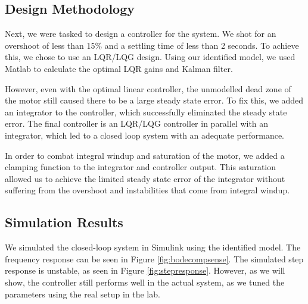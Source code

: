 \documentclass[11pt]{article}
\begin{document}
\subsection{Design Methodology}

Next, we were tasked to design a controller for the system. We shot for an overshoot of less than 15\%
and a settling time of less than 2 seconds. To achieve this, we chose to use an LQR/LQG design. Using our 
identified model, we used Matlab to calculate the optimal LQR gains and Kalman filter. 

However, even with the optimal linear controller, the unmodelled dead zone of the motor still caused
there to be a large steady state error. To fix this, we added an integrator to the controller, which successfully
eliminated the steady state error. The final controller is an LQR/LQG controller in parallel with an integrator, which led
to a closed loop system with an adequate performance.

In order to combat integral windup and saturation of the motor, we added a 
clamping function to the integrator and controller output. This saturation
allowed us to achieve the limited steady state error of the integrator without 
suffering from the overshoot and instabilities that come from integral windup.

\subsection{Simulation Results}
We simulated the closed-loop system in Simulink using the identified model. The frequency response
can be seen in Figure \ref{fig:bodecompsense}. The simulated step response is unstable, as 
seen in Figure \ref{fig:stepresponse}. However, as we will show, the controller still performs well in 
the actual system, as we tuned the parameters using the real setup in the lab.
\end{document}
